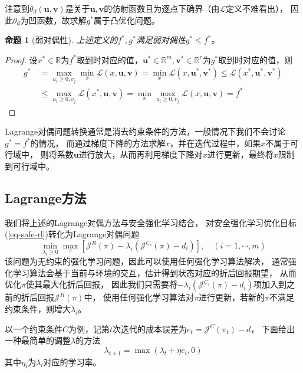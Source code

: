 \documentclass[12pt, a4paper, oneside]{ctexart}
\newtheorem{proposition}{命题}
\numberwithin{equation}{section}  %
\def\bd{\boldsymbol}        %
\def\R{\mathbb{R}}          %
\def\L{\mathcal{L}}         %
\def\J{\mathcal{J}}
\begin{document}
注意到$\theta_d(\bd{u},\bd{v})$是关于$\bd{u},\bd{v}$的仿射函数且为逐点下确界（由$\L$定义不难看出），
因此$\theta_d$为凹函数，故求解$g^*$属于凸优化问题。
\begin{proposition}[弱对偶性]
    上述定义的$f^*,g^*$满足弱对偶性$g^*\leqslant f^*$。
\end{proposition}
\begin{proof}
    设$x^*\in\R$为$f^*$取到时对应的值，$\bd{u}^*\in\R^m,\bd{v}^*\in\R^r$为$g^*$取到时对应的值，则
    \begin{equation}
        \begin{aligned}
        g^* &\ = \max_{u_i\geqslant 0,v_j}\min_x\L(x,\bd{u},\bd{v}) = \min_x\L(x,\bd{u}^*,\bd{v}^*)\leqslant \L(x^*,\bd{u}^*,\bd{v}^*)\\
        &\ \leqslant \max_{u_i\geqslant 0,v_j}\L(x^*,\bd{u},\bd{v}) = \min_x\max_{u_i\geqslant 0,v_j}\L(x,\bd{u},\bd{v}) = f^*
        \end{aligned}
    \end{equation}
\end{proof}

Lagrange对偶问题转换通常是消去约束条件的方法，一般情况下我们不会讨论$g^*=f^*$的情况，
而通过梯度下降的方法求解$x$，并在迭代过程中，如果$x$不属于可行域中，
则将系数$\bd{u}$进行放大，从而再利用梯度下降对$x$进行更新，最终将$x$限制到可行域中。
\subsection{Lagrange方法}
我们将上述的Lagrange对偶方法与安全强化学习结合，
对安全强化学习优化目标(\ref{eq-safe-rl})转化为Lagrange对偶问题
\begin{equation}
    \min_{\lambda_i \geqslant 0}\max_{\pi}\left[\J^R(\pi)-\lambda_i(\J^{C_i}(\pi)-d_i)\right],\quad (i=1,\cdots,m)
\end{equation}
该问题为无约束的强化学习问题，因此可以使用任何强化学习算法解决，
通常强化学习算法会基于当前与环境的交互，估计得到状态对应的折后回报期望，
从而优化$\pi$使其最大化折后回报，
因此我们只需要将$-\lambda_i(\J^{C_i}(\pi)-d_i)$项加入到之前的折后回报$\J^R(\pi)$中，
使用任何强化学习算法对$\pi$进行更新，若新的$\pi$不满足约束条件，则增大$\lambda_i$。

以一个约束条件$C$为例，记第$t$次迭代的成本误差为$e_t=\J^{C}(\pi_t)-d$，
下面给出一种最简单的调整$\lambda$的方法
\begin{equation}
    \lambda_{t+1} = \max\left(\lambda_{t}+\eta e_t,0\right)
\end{equation}
其中$\eta_i$为$\lambda_i$对应的学习率。
\end{document}

